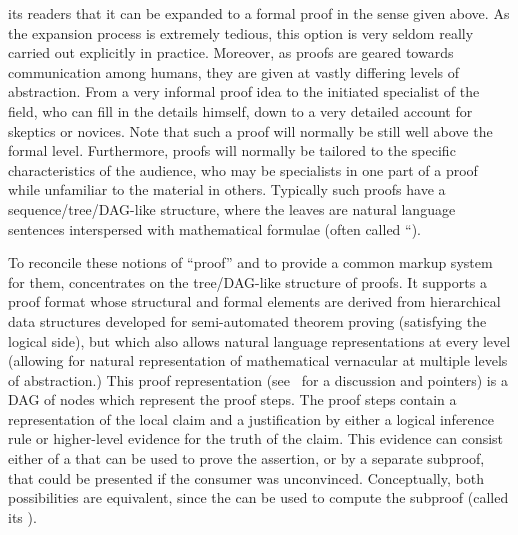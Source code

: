 its readers that it can be expanded to a formal proof in the sense given above. As the
expansion process is extremely tedious, this option is very seldom really carried out
explicitly in practice. Moreover, as proofs are geared towards communication among humans,
they are given at vastly differing levels of abstraction. From a very informal proof idea
to the initiated specialist of the field, who can fill in the details himself, down to a
very detailed account for skeptics or novices. Note that such a proof will normally be
still well above the formal level. Furthermore, proofs will normally be tailored to the
specific characteristics of the audience, who may be specialists in one part of a proof
while unfamiliar to the material in others. Typically such proofs have a
sequence/tree/DAG-like structure, where the leaves are natural language sentences
interspersed with mathematical formulae (often called ``{}).

To reconcile these notions of ``proof'' and to provide a common markup system for
them, {\omdoc} concentrates on the tree/DAG-like structure of proofs. It supports
a proof format whose structural and formal elements are derived from hierarchical
data structures developed for semi-automated theorem proving (satisfying the
logical side), but which also allows natural language representations at every
level (allowing for natural representation of mathematical vernacular at multiple
levels of abstraction.) This proof representation
(see~\cite{BenzmuellerEtAl:otama97} for a discussion and pointers) is a DAG of
nodes which represent the proof steps. The proof steps contain a representation of
the local claim and a justification by either a logical inference rule or
higher-level evidence for the truth of the claim.  This evidence can consist
either of a {} that can be used to prove the assertion, or
by a separate subproof, that could be presented if the consumer was unconvinced.
Conceptually, both possibilities are equivalent, since the {} can
be used to compute the subproof (called its {}).

